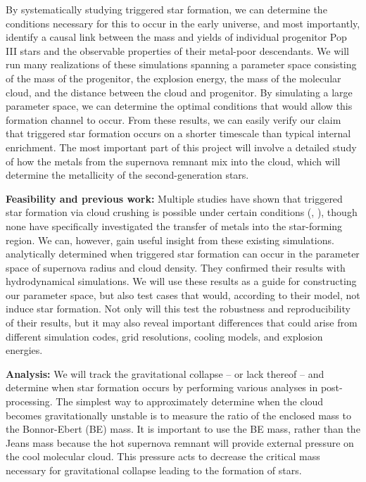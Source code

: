 \documentclass[letterpaper, 12pt]{article}
\begin{document}
By systematically studying triggered star formation, we can determine the conditions necessary for this to occur in the early universe, and most importantly, identify a causal link between the mass and yields of individual progenitor Pop III stars and the observable properties of their metal-poor descendants. We will run many realizations of these simulations spanning a parameter space consisting of the mass of the progenitor, the explosion energy, the mass of the molecular cloud, and the distance between the cloud and progenitor. By simulating a large parameter space, we can determine the optimal conditions that would allow this formation channel to occur. From these results, we can easily verify our claim that triggered star formation occurs on a shorter timescale than typical internal enrichment. The most important part of this project will involve a detailed study of how the metals from the supernova remnant mix into the cloud, which will determine the metallicity of the second-generation stars.

\textbf{Feasibility and previous work:} Multiple studies have shown that triggered star formation via cloud crushing is possible under certain conditions (\cite{Melioli2006}, \cite{Leao2009}), though none have specifically investigated the transfer of metals into the star-forming region. We can, however, gain useful insight from these existing simulations. \cite{Melioli2006} analytically determined when triggered star formation can occur in the parameter space of supernova radius and cloud density. They confirmed their results with hydrodynamical simulations. We will use these results as a guide for constructing our parameter space, but also test cases that would, according to their model, not induce star formation. Not only will this test the robustness and reproducibility of their results, but it may also reveal important differences that could arise from different simulation codes, grid resolutions, cooling models, and explosion energies.

\textbf{Analysis:} We will track the gravitational collapse -- or lack thereof -- and determine when star formation occurs by performing various analyses in post-processing. The simplest way to approximately determine when the cloud becomes gravitationally unstable is to measure the ratio of the enclosed mass to the Bonnor-Ebert (BE) mass. It is important to use the BE mass, rather than the Jeans mass because the hot supernova remnant will provide external pressure on the cool molecular cloud. This pressure acts to decrease the critical mass necessary for gravitational collapse leading to the formation of stars.
\end{document}
